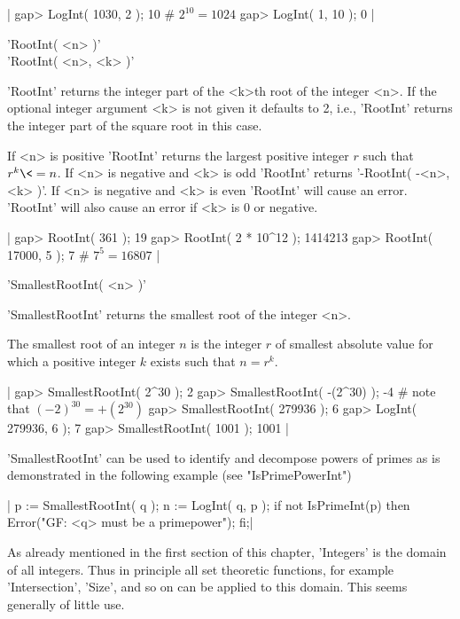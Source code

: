 |    gap> LogInt( 1030, 2 );
    10        # $2^{10} = 1024$
    gap> LogInt( 1, 10 );
    0 |

%

'RootInt( <n> )' \\
'RootInt( <n>, <k> )'

'RootInt' returns the integer part of the <k>th root  of the integer <n>.
If the optional integer argument <k> is not given it defaults to 2, i.e.,
'RootInt' returns the integer part of the square root in this case.

If  <n> is positive  'RootInt' returns  the  largest positive integer $r$
such that $r^k \<=  n$.  If <n>  is negative and  <k>  is  odd  'RootInt'
returns '-RootInt( -<n>,  <k> )'.  If  <n> is negative   and <k> is  even
'RootInt' will cause an error.  'RootInt' will also cause an error if <k>
is 0 or negative.

|    gap> RootInt( 361 );
    19
    gap> RootInt( 2 * 10^12 );
    1414213
    gap> RootInt( 17000, 5 );
    7        # $7^5 = 16807$ |

%

'SmallestRootInt( <n> )'

'SmallestRootInt' returns the smallest root of the integer <n>.

The  smallest  root of an  integer $n$  is  the  integer $r$  of smallest
absolute  value for which  a  positive integer $k$ exists such  that $n =
r^k$.

|    gap> SmallestRootInt( 2^30 );
    2
    gap> SmallestRootInt( -(2^30) );
    -4        # note that $(-2)^{30} = +(2^{30})$
    gap> SmallestRootInt( 279936 );
    6
    gap> LogInt( 279936, 6 );
    7
    gap> SmallestRootInt( 1001 );
    1001 |

'SmallestRootInt' can be used to  identify and decompose powers of primes
as is demonstrated in the following example (see "IsPrimePowerInt")

|    p := SmallestRootInt( q );  n := LogInt( q, p );
    if not IsPrimeInt(p) then Error("GF: <q> must be a primepower"); fi;|


As already mentioned in the first section of  this chapter, 'Integers' is
the  domain  of  all integers.   Thus  in  principle  all  set  theoretic
functions, for  example 'Intersection', 'Size',  and so on can be applied
to this domain.  This seems generally of little use.

